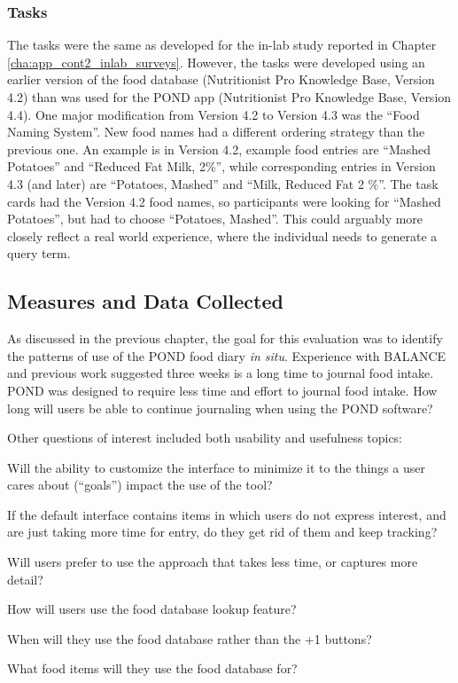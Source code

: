 \subsubsection{Tasks}
The tasks were the same as developed for the in-lab study reported in Chapter \ref{cha:app_cont2_inlab_surveys}. However, the tasks were developed using an earlier version of the food database (Nutritionist Pro Knowledge Base, Version 4.2) than was used for the POND app (Nutritionist Pro Knowledge Base, Version 4.4). One major modification from Version 4.2 to Version 4.3 was the ``Food Naming System''. New food names had a different ordering strategy than the previous one. An example is in Version 4.2, example food entries are ``Mashed Potatoes'' and ``Reduced Fat Milk, 2\%'', while corresponding entries in Version 4.3 (and later) are ``Potatoes, Mashed'' and ``Milk, Reduced Fat 2 \%''. The task cards had the Version 4.2 food names, so participants were looking for ``Mashed Potatoes'', but had to choose ``Potatoes, Mashed''. This could arguably more closely reflect a real world experience, where the individual needs to generate a query term.



\subsection{Measures and Data Collected}
As discussed in the previous chapter, the goal for this evaluation was to identify the patterns of use of the POND food diary \textit{in situ}. Experience with BALANCE and previous work suggested three weeks is a long time to journal food intake. POND was designed to require less time and effort to journal food intake. How long will users be able to continue journaling when using the POND software?

Other questions of interest included both usability and usefulness topics:
\begin{itemize*}
\item Will the ability to customize the interface to minimize it to the things a user cares
about (``goals'') impact the use of the tool?
\item If the default interface contains items in which users do not express interest, and are
just taking more time for entry, do they get rid of them and keep tracking?
\item Will users prefer to use the approach that takes less time, or captures more detail?
\item How will users use the food database lookup feature?
\item When will they use the food database rather than the +1 buttons?
\item What food items will they use the food database for?
\end{itemize*}

